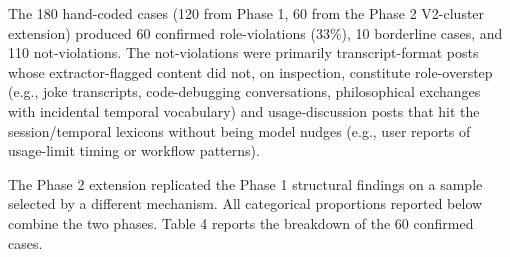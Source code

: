 \documentclass[11pt]{article}
\begin{document}
The 180 hand-coded cases (120 from Phase 1, 60 from the Phase 2 V2-cluster extension) produced 60 confirmed role-violations (33\%), 10 borderline cases, and 110 not-violations. The not-violations were primarily transcript-format posts whose extractor-flagged content did not, on inspection, constitute role-overstep (e.g., joke transcripts, code-debugging conversations, philosophical exchanges with incidental temporal vocabulary) and usage-discussion posts that hit the session/temporal lexicons without being model nudges (e.g., user reports of usage-limit timing or workflow patterns).

The Phase 2 extension replicated the Phase 1 structural findings on a sample selected by a different mechanism. All categorical proportions reported below combine the two phases. Table 4 reports the breakdown of the 60 confirmed cases.
\end{document}
